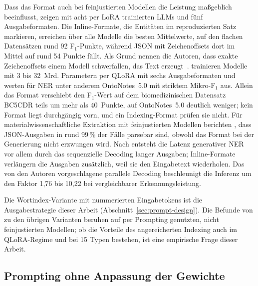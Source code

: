Dass das Format auch bei feinjustierten Modellen die Leistung
maßgeblich beeinflusst, zeigen \textcite{zhan2026generativeNER} mit acht
per LoRA trainierten LLMs und fünf Ausgabeformaten.
Die Inline-Formate, die Entitäten im reproduzierten Satz markieren,
erreichen über alle Modelle die besten Mittelwerte, auf den flachen
Datensätzen rund 92 F$_1$-Punkte, während JSON mit Zeichenoffsets dort
im Mittel auf rund 54 Punkte fällt.
Als Grund nennen die Autoren, dass exakte Zeichenoffsets einem Modell
schwerfallen, das Text
erzeugt~\cite[Abschn.~3.2]{zhan2026generativeNER}.
\textcite{ravikumar2026lostformatting} trainieren Modelle mit 3 bis
32~Mrd. Parametern per QLoRA mit sechs Ausgabeformaten und werten für
NER unter anderem OntoNotes~5.0 mit striktem Mikro-F$_1$ aus.
Allein das Format verschiebt den F$_1$-Wert auf dem biomedizinischen
Datensatz BC5CDR teils um mehr als 40~Punkte, auf OntoNotes~5.0 deutlich
weniger; kein Format
liegt durchgängig vorn, und ein Indexing-Format prüfen sie nicht.
Für materialwissenschaftliche Extraktion mit feinjustierten Modellen
berichten \textcite{dagdelen2024structuredIE},
dass JSON-Ausgaben in rund 99\,\% der Fälle parsebar sind, obwohl das
Format bei der Generierung nicht erzwungen wird.
Nach \textcite{lu2024padellm} entsteht die Latenz generativer NER vor
allem durch das sequenzielle Decoding langer Ausgaben; Inline-Formate
verlängern die Ausgaben zusätzlich, weil sie den Eingabetext
wiederholen. Das von den Autoren vorgeschlagene parallele Decoding
beschleunigt die Inferenz um den Faktor 1{,}76 bis 10{,}22 bei
vergleichbarer Erkennungsleistung.

Die Wortindex-Variante mit nummerierten Eingabetokens ist die
Ausgabestrategie dieser Arbeit (Abschnitt~\ref{sec:prompt-design}).
Die Befunde von \textcite{semin2026spanLabeling} zu den übrigen Varianten
beruhen auf per
Prompting genutzten, nicht feinjustierten Modellen; ob die Vorteile des
angereicherten Indexing auch im QLoRA-Regime und bei 15 Typen bestehen,
ist eine empirische Frage dieser Arbeit.

\subsection{Prompting ohne Anpassung der Gewichte}
\label{sec:k3-prompting}

